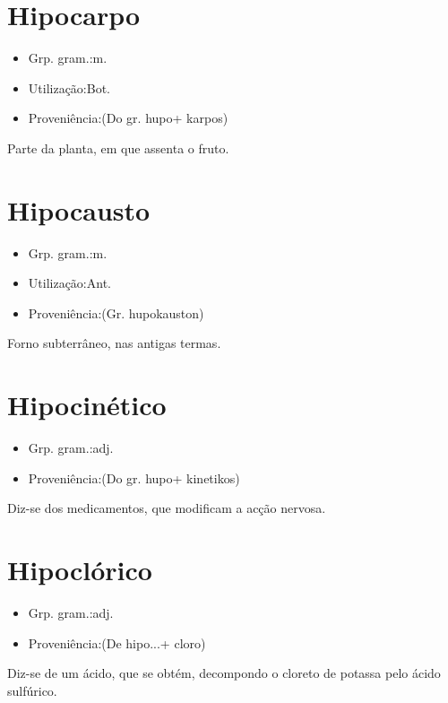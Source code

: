 \documentclass{article}
\begin{document}
\section{Hipocarpo}
\begin{itemize}
\item {Grp. gram.:m.}
\end{itemize}
\begin{itemize}
\item {Utilização:Bot.}
\end{itemize}
\begin{itemize}
\item {Proveniência:(Do gr. \textunderscore hupo\textunderscore  + \textunderscore karpos\textunderscore )}
\end{itemize}
Parte da planta, em que assenta o fruto.
\section{Hipocausto}
\begin{itemize}
\item {Grp. gram.:m.}
\end{itemize}
\begin{itemize}
\item {Utilização:Ant.}
\end{itemize}
\begin{itemize}
\item {Proveniência:(Gr. \textunderscore hupokauston\textunderscore )}
\end{itemize}
Forno subterrâneo, nas antigas termas.
\section{Hipocinético}
\begin{itemize}
\item {Grp. gram.:adj.}
\end{itemize}
\begin{itemize}
\item {Proveniência:(Do gr. \textunderscore hupo\textunderscore  + \textunderscore kinetikos\textunderscore )}
\end{itemize}
Diz-se dos medicamentos, que modificam a acção nervosa.
\section{Hipoclórico}
\begin{itemize}
\item {Grp. gram.:adj.}
\end{itemize}
\begin{itemize}
\item {Proveniência:(De \textunderscore hipo...\textunderscore  + \textunderscore cloro\textunderscore )}
\end{itemize}
Diz-se de um ácido, que se obtém, decompondo o cloreto de potassa pelo ácido sulfúrico.
\end{document}
